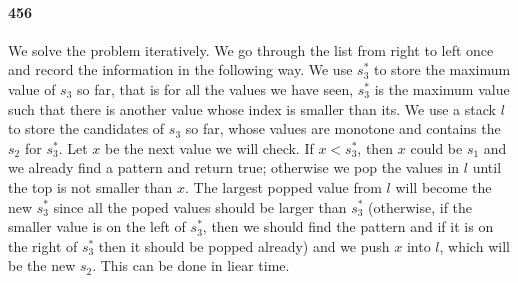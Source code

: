 \documentclass[11pt]{article}
\begin{document}
\paragraph{456}
We solve the problem iteratively. We go through the list from right to left once and record the information in the following 
way. We use $s^*_3$ to store the maximum value of $s_3$ so far, that is for all the values 
we have seen, $s^*_3$ is the maximum value such that there is another value whose index is smaller than its.
We use a stack $l$ to store the candidates of $s_3$ so far, whose values are monotone and contains the $s_2$ for $s^*_3$.
Let $x$ be the next value we will check. If $x < s^*_3$, then $x$ could be $s_1$ and we already find a 
pattern and return true; otherwise we pop the values in $l$ until the top is not smaller than $x$. The largest popped value from
$l$ will become the new $s^*_3$ since all the poped values should be larger than $s^*_3$ (otherwise, if the smaller value is 
on the left of $s^*_3$, then we should find the pattern and if it is on the right of $s^*_3$ then it should be popped already) 
and we push $x$ into $l$, which will be the new $s_2$. This can be done in liear time.
\end{document}
